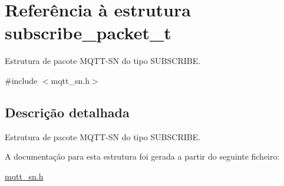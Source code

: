 \hypertarget{structsubscribe__packet__t}{\section{Referência à estrutura subscribe\+\_\+packet\+\_\+t}
\label{structsubscribe__packet__t}
}


Estrutura de pacote M\+Q\+T\+T-\/\+S\+N do tipo S\+U\+B\+S\+C\+R\+I\+B\+E.  




{\ttfamily \#include $<$mqtt\+\_\+sn.\+h$>$}



\subsection{Descrição detalhada}
Estrutura de pacote M\+Q\+T\+T-\/\+S\+N do tipo S\+U\+B\+S\+C\+R\+I\+B\+E. 

A documentação para esta estrutura foi gerada a partir do seguinte ficheiro\+:\begin{DoxyCompactItemize}
\item 
\hyperlink{mqtt__sn_8h}{mqtt\+\_\+sn.\+h}\end{DoxyCompactItemize}
